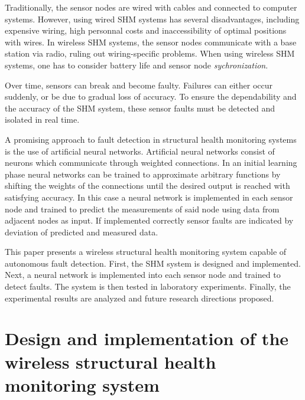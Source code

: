 \documentclass[12pt]{scrartcl}
\begin{document}
Traditionally, the sensor nodes are wired with cables and connected to computer systems.
However, using wired SHM systems has several disadvantages, including expensive wiring, high personnal costs and inaccessibility of optimal positions with wires.
In wireless SHM systems, the sensor nodes communicate with a base station via radio, ruling out wiring-specific problems.
When using wireless SHM systems, one has to consider battery life and sensor node \textit{sychronization}.

Over time, sensors can break and become faulty. Failures can either occur suddenly, or be due to gradual loss of accuracy.
To ensure the dependability and the accuracy of the SHM system, these sensor faults must be detected and isolated in real time. 


A promising approach to fault detection in structural health monitoring systems is the use of artificial neural networks.
Artificial neural networks consist of neurons which communicate through weighted connections.
In an initial learning phase neural networks can be trained to approximate arbitrary functions by shifting the weights of the connections until the desired output is reached with satisfying accuracy.
In this case a neural network is implemented in each sensor node and trained to predict the measurements of said node using data from adjacent nodes as input.
If implemented correctly sensor faults are indicated by deviation of predicted and measured data.

This paper presents a wireless structural health monitoring system capable of autonomous fault detection. 
First, the SHM system is designed and implemented. 
Next, a neural network is implemented into each sensor node and trained to detect faults. 
The system is then tested in laboratory experiments. 
Finally, the experimental results are analyzed and future research directions proposed.



\section*{Design and implementation of the wireless structural health monitoring system}
\end{document}
